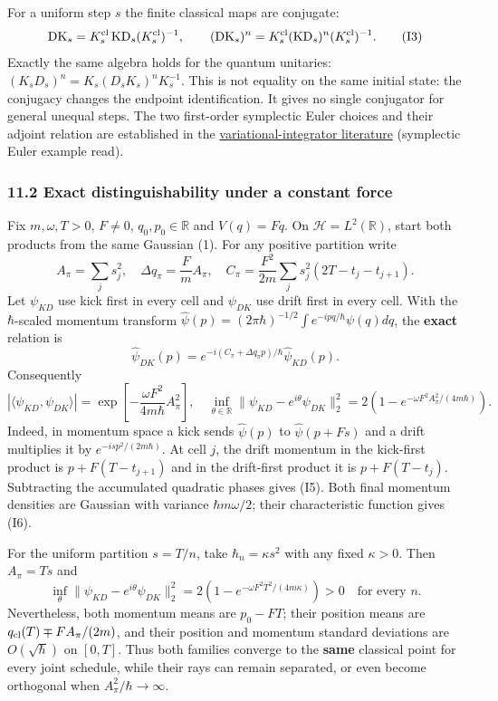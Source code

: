 \documentclass[11pt,a4paper]{article}
\begin{document}
For a uniform step \(s\) the finite classical maps are conjugate:
\[\operatorname{DK}_s
 =K_s^{\rm cl}\operatorname{KD}_s(K_s^{\rm cl})^{-1},\qquad
 (\operatorname{DK}_s)^n
 =K_s^{\rm cl}(\operatorname{KD}_s)^n(K_s^{\rm cl})^{-1}. \tag{I3}
\] Exactly the same algebra holds for the quantum unitaries:
\((K_sD_s)^n=K_s(D_sK_s)^nK_s^{-1}\). This is not equality on the same
initial state: the conjugacy changes the endpoint identification. It
gives no single conjugator for general unequal steps. The two
first-order symplectic Euler choices and their adjoint relation are
established in the
\href{https://escholarship.org/uc/item/9wm0q93j}{variational-integrator
literature} (symplectic Euler example read).

\hypertarget{exact-distinguishability-under-a-constant-force}{%
\subsubsection{11.2 Exact distinguishability under a constant
force}\label{exact-distinguishability-under-a-constant-force}}

Fix \(m,\omega,T>0\), \(F\ne0\), \(q_0,p_0\in\mathbb R\) and
\(V(q)=Fq\). On \(\mathcal H=L^2(\mathbb R)\), start both products from
the same Gaussian (1). For any positive partition write \[
 A_\pi=\sum_js_j^2,\quad
 \Delta q_\pi=\frac{F}{m}A_\pi,\quad
 C_\pi=\frac{F^2}{2m}\sum_js_j^2(2T-t_j-t_{j+1}). \tag{I4}
\] Let \(\psi_{KD}\) use kick first in every cell and \(\psi_{DK}\) use
drift first in every cell. With the \(\hbar\)-scaled momentum transform
\(\widehat\psi(p)=(2\pi\hbar)^{-1/2}\int e^{-ipq/\hbar}\psi(q)dq\), the
\textbf{exact} relation is \[
 \widehat\psi_{DK}(p)
 =e^{-i(C_\pi+\Delta q_\pi p)/\hbar}
   \widehat\psi_{KD}(p). \tag{I5}
\] Consequently \[
 \left|\langle\psi_{KD},\psi_{DK}\rangle\right|
 =\exp\!\left[-\frac{\omega F^2}{4m\hbar}A_\pi^2\right],\quad
 \inf_{\theta\in\mathbb R}
   \|\psi_{KD}-e^{i\theta}\psi_{DK}\|_2^2
 =2\!\left(1-e^{-\omega F^2A_\pi^2/(4m\hbar)}\right). \tag{I6}
\] Indeed, in momentum space a kick sends \(\widehat\psi(p)\) to
\(\widehat\psi(p+Fs)\) and a drift multiplies it by
\(e^{-isp^2/(2m\hbar)}\). At cell \(j\), the drift momentum in the
kick-first product is \(p+F(T-t_{j+1})\) and in the drift-first product
it is \(p+F(T-t_j)\). Subtracting the accumulated quadratic phases gives
(I5). Both final momentum densities are Gaussian with variance
\(\hbar m\omega/2\); their characteristic function gives (I6).

For the uniform partition \(s=T/n\), take \(\hbar_n=\kappa s^2\) with
any fixed \(\kappa>0\). Then \(A_\pi=Ts\) and \[
 \inf_\theta\|\psi_{KD}-e^{i\theta}\psi_{DK}\|_2^2
 =2\!\left(1-e^{-\omega F^2T^2/(4m\kappa)}\right)>0
 \quad\text{for every }n. \tag{I7}
\] Nevertheless, both momentum means are \(p_0-FT\); their position
means are \(q_{\rm cl}(T)\mp F A_\pi/(2m)\), and their position and
momentum standard deviations are \(O(\sqrt\hbar)\) on \([0,T]\). Thus
both families converge to the \textbf{same} classical point for every
joint schedule, while their rays can remain separated, or even become
orthogonal when \(A_\pi^2/\hbar\to\infty\).
\end{document}
